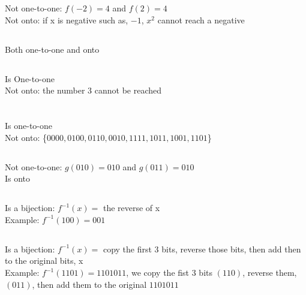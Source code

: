 \documentclass[letterpaper]{article}
\begin{document}
	\section{}
    	\subsection{}
        	Not one-to-one: $f(-2) = 4$ and $f(2) = 4$ \\
            Not onto: if x is negative such as, $-1$, $x^2$ cannot reach a negative
        \subsection{}
        	Both one-to-one and onto
        \subsection{}
        	Is One-to-one \\
            Not onto: the number 3 cannot be reached
	\section{}
    	\subsection{}
        	Is one-to-one \\
            Not onto: \{$0000, 0100, 0110, 0010, 1111, 1011, 1001, 1101$\}
        \subsection{}
        	Not one-to-one: $g(010) = 010$ and $g(011) = 010$ \\
            Is onto
        \subsection{}
        	Is a bijection: $f^{-1}(x) =$ the reverse of x\\
            Example: $f^{-1}(100) = 001$
        \subsection{}
        	Is a bijection: $f^{-1}(x) =$ copy the first 3 bits, reverse those bits, then add then to the original bits, x\\
            Example: $f^{-1}(1101) = 1101011$, we copy the fist 3 bits $(110)$, reverse them, $(011)$, then add them to the original $1101011$ 
\end{document}
